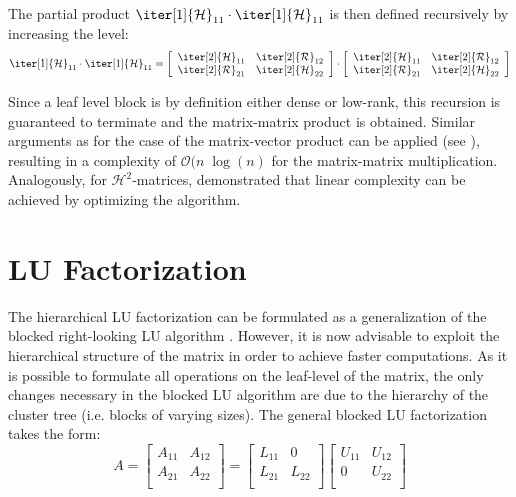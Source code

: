 \noindent The partial product $\iter[1]{\mathcal{H}}_{11} \cdot \iter[1]{\mathcal{H}}_{11}$ is then defined recursively by increasing the level:
\begin{equation}
    \iter[1]{\mathcal{H}}_{11} \cdot \iter[1]{\mathcal{H}}_{11}= 
      \left[
    \begin{array}{cc}
       \iter[2]{\mathcal{H}}_{11}& \iter[2]{\mathcal{R}}_{12} \\
      \iter[2]{\mathcal{R}}_{21} & \iter[2]{\mathcal{H}}_{22} \\
    \end{array}
  \right] \cdot 
  \left[
    \begin{array}{cc}
       \iter[2]{\mathcal{H}}_{11}& \iter[2]{\mathcal{R}}_{12} \\
      \iter[2]{\mathcal{R}}_{21} & \iter[2]{\mathcal{H}}_{22} \\
    \end{array}
  \right]
\end{equation}

\noindent Since a leaf level block is by definition either dense or low-rank, this recursion is guaranteed to terminate and the matrix-matrix product is obtained. Similar arguments as for the case of the matrix-vector product can be applied (see \cite{hackbusch_hierarchical_2015}), resulting in a complexity of $\mathcal{O}(n \;\log(n)$ for the matrix-matrix multiplication.
Analogously, for $\mathcal{H}^2$-matrices, \cite{borm_h2-matrix_2006} demonstrated that linear complexity can be achieved by optimizing the algorithm.


\section{LU Factorization}
\label{sec:h_lu}
The hierarchical LU factorization can be formulated as a generalization of the blocked right-looking LU algorithm \cite{carratala-saez_exploiting_2019}. However, it is now advisable to exploit the hierarchical structure of the matrix in order to achieve faster computations. As it is possible to formulate all operations on the leaf-level of the matrix, the only changes necessary in the blocked LU algorithm are due to the hierarchy of the cluster tree (i.e. blocks of varying sizes). The general blocked LU factorization takes the form:
\begin{equation}
    A = 
  \left[
    \begin{array}{cc}
      A_{11}& A_{12} \\
      A_{21} & A_{22} \\
    \end{array}
  \right] = 
  \left[
    \begin{array}{cc}
      L_{11}& 0 \\
      L_{21} & L_{22} \\
    \end{array}
  \right]
  \left[
    \begin{array}{cc}
       U_{11}& U_{12} \\
       0 & U_{22} \\
    \end{array}
  \right]
\end{equation}

